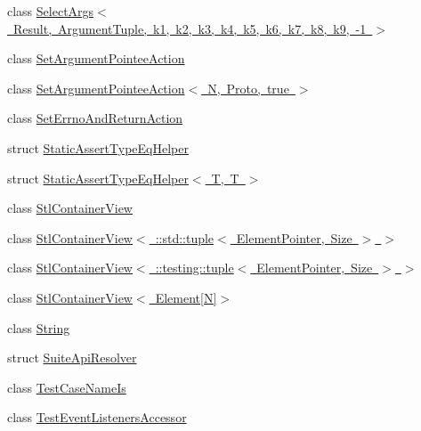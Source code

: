 \begin{DoxyCompactItemize}
\item 
class \mbox{\hyperlink{classtesting_1_1internal_1_1_select_args_3_01_result_00_01_argument_tuple_00_01k1_00_01k2_00_01k6840fe77dccd76bc2d4e4ee1c75cd6f1}{Select\+Args$<$ Result, Argument\+Tuple, k1, k2, k3, k4, k5, k6, k7, k8, k9, -\/1 $>$}}
\item 
class \mbox{\hyperlink{structtesting_1_1internal_1_1_set_argument_pointee_action}{Set\+Argument\+Pointee\+Action}}
\item 
class \mbox{\hyperlink{classtesting_1_1internal_1_1_set_argument_pointee_action_3_01_n_00_01_proto_00_01true_01_4}{Set\+Argument\+Pointee\+Action$<$ N, Proto, true $>$}}
\item 
class \mbox{\hyperlink{classtesting_1_1internal_1_1_set_errno_and_return_action}{Set\+Errno\+And\+Return\+Action}}
\item 
struct \mbox{\hyperlink{structtesting_1_1internal_1_1_static_assert_type_eq_helper}{Static\+Assert\+Type\+Eq\+Helper}}
\item 
struct \mbox{\hyperlink{structtesting_1_1internal_1_1_static_assert_type_eq_helper_3_01_t_00_01_t_01_4}{Static\+Assert\+Type\+Eq\+Helper$<$ T, T $>$}}
\item 
class \mbox{\hyperlink{classtesting_1_1internal_1_1_stl_container_view}{Stl\+Container\+View}}
\item 
class \mbox{\hyperlink{classtesting_1_1internal_1_1_stl_container_view_3_01_1_1std_1_1tuple_3_01_element_pointer_00_01_size_01_4_01_4}{Stl\+Container\+View$<$ \+::std\+::tuple$<$ Element\+Pointer, Size $>$ $>$}}
\item 
class \mbox{\hyperlink{classtesting_1_1internal_1_1_stl_container_view_3_01_1_1testing_1_1tuple_3_01_element_pointer_00_01_size_01_4_01_4}{Stl\+Container\+View$<$ \+::testing\+::tuple$<$ Element\+Pointer, Size $>$ $>$}}
\item 
class \mbox{\hyperlink{classtesting_1_1internal_1_1_stl_container_view_3_01_element[_n]_4}{Stl\+Container\+View$<$ Element\mbox{[}\+N\mbox{]}$>$}}
\item 
class \mbox{\hyperlink{classtesting_1_1internal_1_1_string}{String}}
\item 
struct \mbox{\hyperlink{structtesting_1_1internal_1_1_suite_api_resolver}{Suite\+Api\+Resolver}}
\item 
class \mbox{\hyperlink{classtesting_1_1internal_1_1_test_case_name_is}{Test\+Case\+Name\+Is}}
\item 
class \mbox{\hyperlink{classtesting_1_1internal_1_1_test_event_listeners_accessor}{Test\+Event\+Listeners\+Accessor}}

\end{DoxyCompactItemize}
